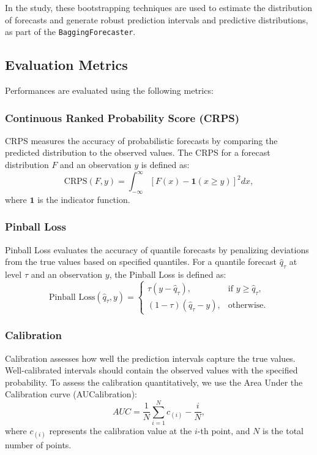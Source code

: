 In the study, these bootstrapping techniques are used to estimate the distribution of forecasts and generate robust prediction intervals and predictive distributions, as part of the \texttt{BaggingForecaster}.


\subsection{Evaluation Metrics}
Performances are evaluated using the following metrics:

\subsubsection{Continuous Ranked Probability Score (CRPS)}
CRPS \cite{matheson1976} measures the accuracy of probabilistic forecasts by comparing the predicted distribution to the observed values. The CRPS for a forecast distribution \( F \) and an observation \( y \) is defined as:
\begin{equation}
\text{CRPS}(F, y) = \int_{-\infty}^\infty \left[ F(x) - \mathbf{1}(x \ge y) \right]^2 dx,
\end{equation}
where \( \mathbf{1} \) is the indicator function.

\subsubsection{Pinball Loss}
Pinball Loss evaluates the accuracy of quantile forecasts by penalizing deviations from the true values based on specified quantiles. For a quantile forecast \( \hat{q}_\tau \) at level \( \tau \) and an observation \( y \), the Pinball Loss is defined as:
\begin{equation}
\text{Pinball Loss}(\hat{q}_\tau, y) = \begin{cases}
\tau (y - \hat{q}_\tau), & \text{if } y \ge \hat{q}_\tau, \\
(1 - \tau) (\hat{q}_\tau - y), & \text{otherwise}.
\end{cases}
\end{equation}

\subsubsection{Calibration}
Calibration assesses how well the prediction intervals capture the true values. Well-calibrated intervals should contain the observed values with the specified probability. To assess the calibration quantitatively, we use the Area Under the Calibration curve (AUCalibration):
\begin{equation}
AUC = \frac{1}{N} \sum_{i=1}^N c_{(i)} - \frac{i}{N},
\end{equation}
where \(c_{(i)}\) represents the calibration value at the \(i\)-th point, and \(N\) is the total number of points.

